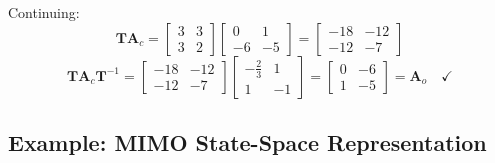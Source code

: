 \begin{example}
Continuing:
\begin{equation}
\mathbf{T}\mathbf{A}_c = \begin{bmatrix} 3 & 3 \\ 3 & 2 \end{bmatrix}\begin{bmatrix} 0 & 1 \\ -6 & -5 \end{bmatrix} = \begin{bmatrix} -18 & -12 \\ -12 & -7 \end{bmatrix}
\end{equation}
\begin{equation}
\mathbf{T}\mathbf{A}_c\mathbf{T}^{-1} = \begin{bmatrix} -18 & -12 \\ -12 & -7 \end{bmatrix}\begin{bmatrix} -\frac{2}{3} & 1 \\ 1 & -1 \end{bmatrix} = \begin{bmatrix} 0 & -6 \\ 1 & -5 \end{bmatrix} = \mathbf{A}_o \quad \checkmark
\end{equation}
\end{example}

\subsection{Example: MIMO State-Space Representation}

